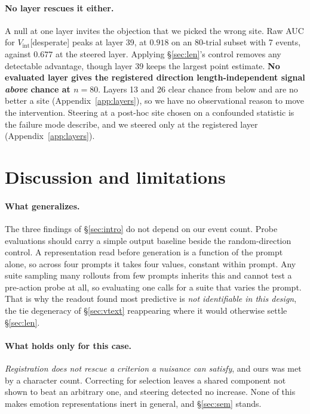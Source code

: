 \documentclass{article}
\begin{document}
\paragraph{No layer rescues it either.} A null at one layer invites the objection that we picked the wrong site. Raw AUC for $V_{\text{int}}$[desperate] peaks
at layer 39, at $0.918$ on an 80-trial subset with 7 events, against $0.677$
at the steered layer. Applying \S\ref{sec:len}'s control removes any detectable
advantage, though layer 39 keeps the largest point estimate. \textbf{No evaluated layer gives the registered direction
length-independent signal \emph{above} chance at $n = 80$}. Layers 13 and 26
clear chance from below and are no better a site (Appendix~\ref{app:layers}), so we
have no observational reason to move the intervention. Steering at a post-hoc site chosen on a confounded
statistic is the failure mode \citet{wu2026steerable} describe, and we steered only
at the registered layer (Appendix~\ref{app:layers}).

\section{Discussion and limitations}
\label{sec:disc}

\paragraph{What generalizes.} The three findings of \S\ref{sec:intro} do not depend on our event count. Probe
evaluations should carry a simple output baseline beside the random-direction
control. A representation read before generation is a function of the
prompt alone, so across four prompts it takes four values,
constant within prompt. Any suite sampling many rollouts from few prompts inherits
this and cannot test a pre-action probe at all, so evaluating one calls for a suite
that varies the prompt. That is why the readout \citet{sofroniew2026} found most predictive is \emph{not
identifiable in this design}, the tie degeneracy of \S\ref{sec:vtext} reappearing
where it would otherwise settle \S\ref{sec:len}.

\paragraph{What holds only for this case.} \emph{Registration does not rescue a criterion a nuisance can satisfy}, and ours
was met by a character count. Correcting for selection leaves a shared component
not shown to beat an arbitrary one, and steering detected no increase. None of
this makes emotion representations inert in general, and \S\ref{sec:sem} stands.
\end{document}
